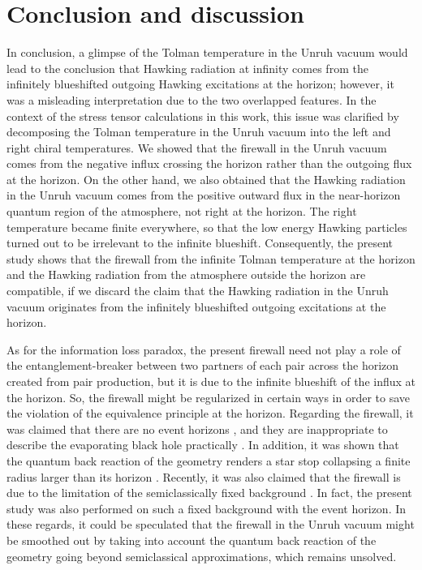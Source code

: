 \documentclass[aps,preprint,a4paper,showpacs,showkeys,superscriptaddress]{revtex4-1}
\begin{document}
\section{Conclusion and discussion}
\label{sec:Diss}
In conclusion, a glimpse of the Tolman temperature in the Unruh vacuum
would lead to the conclusion that
Hawking radiation at infinity comes
from the infinitely blueshifted outgoing Hawking excitations at the horizon;
however, it was a misleading interpretation due to the two overlapped features.
In the context of the stress tensor calculations in this work,
this issue was clarified by decomposing the Tolman temperature in the Unruh vacuum
into the left and right chiral temperatures.
We showed that the firewall
in the Unruh vacuum comes from the negative influx crossing the horizon
rather than the outgoing flux at the horizon.
On the other hand, we also obtained that the Hawking radiation in the Unruh vacuum
comes from the positive
outward flux in the near-horizon quantum region of the atmosphere, not right at the horizon.
The right temperature became finite everywhere, so that
the low energy Hawking particles turned out to be irrelevant to the infinite blueshift.
Consequently,
the present study shows that the firewall from the infinite Tolman temperature at the horizon
and the Hawking radiation from the atmosphere outside the horizon are compatible,
if we discard the claim that the Hawking radiation in the Unruh vacuum
originates from the infinitely blueshifted
outgoing excitations at the horizon.

As for the information loss paradox, the present firewall need not play
a role of the entanglement-breaker between two partners of each pair across the horizon
created from pair production, but it is due to the infinite blueshift of
the influx at the horizon. So,
the firewall might be regularized in certain ways in order
to save the violation of the equivalence principle at the horizon.
Regarding the firewall,
it was claimed that there are no event horizons
\cite{Hawking:2014tga}, and they are inappropriate to describe the evaporating
black hole practically \cite{Visser:2014zqa}.
In addition, it was shown that the quantum back reaction of the geometry
renders a star stop collapsing a finite radius larger than
its horizon \cite{Mersini-Houghton:2014zka, Mersini-Houghton:2014cta}.
Recently, it was also claimed that the firewall is due to the limitation of
the semiclassically fixed background \cite{Nomura:2016qum}.
In fact, the present study was also performed on such a fixed
background with the event horizon.
In these regards, it could be speculated that the firewall in the Unruh vacuum might be
smoothed out by taking into account the quantum back reaction of the geometry
going beyond semiclassical approximations, which remains unsolved.
\end{document}

